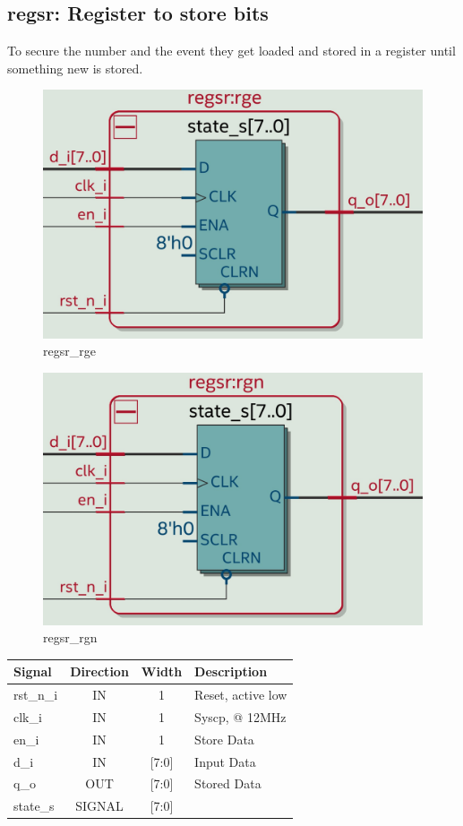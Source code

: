 \documentclass[12pt,a4 paper] {report}
\begin{document}
\subsection{regsr: Register to store bits}
To secure the number and the event they get loaded and stored in a register until something new is stored.
\begin{figure}[h]
	\centering	
	\includegraphics[scale=0.12]{../png/regsr_rge.png}
	\caption{regsr\_rge}
\end{figure}
\begin{figure}[h]
	\centering	
	\includegraphics[scale=0.12]{../png/regsr_rgn.png}
	\caption{regsr\_rgn}
\end{figure}
\begin{center}
	\begin{tabular}{ | p{2cm} | c | c | p{5cm} |}
		\hline
		\textbf{Signal} & \textbf{Direction} & \textbf{Width} & \textbf{Description} \\
		\hline	
 		rst\_n\_i & IN & 1 & Reset, active low \\
 		\hline
		clk\_i & IN & 1 & Syscp, @ 12MHz \\
		\hline
		en\_i & IN & 1 & Store Data \\
		\hline
		d\_i & IN & [7:0] & Input Data \\
		\hline
		q\_o & OUT & [7:0] & Stored Data \\
		\hline
		\hline
		state\_s & SIGNAL & [7:0] & \\
		\hline
		

	\end{tabular}
\end{center}
\end{document}
